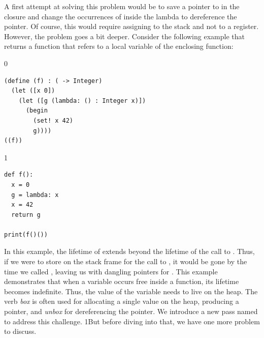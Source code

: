 \documentclass[7x10]{TimesAPriori_MIT}%
\def\racketEd{0}
\def\pythonEd{1}
\providecommand{\BookEdition}{1}
\let\edition\BookEdition
\newcommand{\pythonColor}[0]{}
\newcommand{\python}[1]{{\if\edition\pythonEd\pythonColor #1\fi}}
\numberwithin{theorem}{chapter}
\numberwithin{definition}{chapter}
\numberwithin{equation}{chapter}
\begin{document}
A first attempt at solving this problem would be to save a pointer to
 in the closure and change the occurrences of  inside
the lambda to dereference the pointer. Of course, this would require
assigning  to the stack and not to a register. However, the
problem goes a bit deeper.
Consider the following example that returns a function that refers to
a local variable of the enclosing function:
\begin{center}
\begin{minipage}{\textwidth}
{\if\edition\racketEd
\begin{lstlisting}
(define (f) : ( -> Integer)
  (let ([x 0])
    (let ([g (lambda: () : Integer x)])
      (begin
        (set! x 42)
        g))))
((f))
\end{lstlisting}
\fi}
{\if\edition\pythonEd\pythonColor
\begin{lstlisting}
def f():
  x = 0
  g = lambda: x
  x = 42
  return g

print(f()())
\end{lstlisting}
\fi}
\end{minipage}
\end{center}
In this example, the lifetime of  extends beyond the lifetime
of the call to . Thus, if we were to store  on the
stack frame for the call to , it would be gone by the time we
called , leaving us with dangling pointers for
. This example demonstrates that when a variable occurs free
inside a function, its lifetime becomes indefinite. Thus, the value of
the variable needs to live on the heap.  The verb
\emph{box} is often used for allocating a single
value on the heap, producing a pointer, and
\emph{unbox} for dereferencing the pointer.
%
We introduce a new pass named  to address
this challenge.
%
\python{But before diving into that, we have one more
  problem to discuss.}
\end{document}
